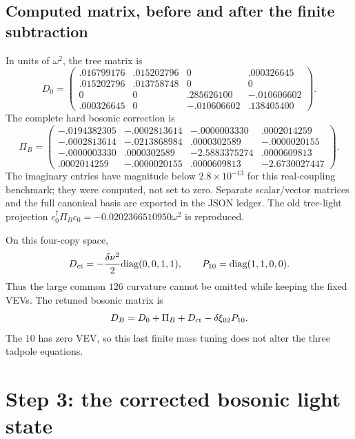 \documentclass[11pt]{article}
\begin{document}
\subsection{Computed matrix, before and after the finite subtraction}
In units of $\omega^2$, the tree matrix is
\begin{equation}
D_0=\begin{pmatrix}
.016799176&.015202796&0&.000326645\\
.015202796&.013758748&0&0\\
0&0&.285626100&-.010606602\\
.000326645&0&-.010606602&.138405400
\end{pmatrix}.
\end{equation}
The complete hard bosonic correction is
\begin{equation}
\Pi_B=\begin{pmatrix}
-.0194382305&-.0002813614&-.0000003330&.0002014259\\
-.0002813614&-.0213868984&.0000302589&-.0000020155\\
-.0000003330&.0000302589&-2.5883375274&.0000609813\\
.0002014259&-.0000020155&.0000609813&-2.6730027447
\end{pmatrix}.
\end{equation}
The imaginary entries have magnitude below $2.8\times10^{-13}$ for this
real-coupling benchmark; they were computed, not set to zero. Separate
scalar/vector matrices and the full canonical basis are exported in the
JSON ledger. The old tree-light projection
$c_0^\dagger\Pi_Bc_0=-0.0202366510950\omega^2$ is reproduced.

On this four-copy space,
\begin{equation}
D_{\rm ct}=-\frac{\delta\nu^2}{2}\mathrm{diag}(0,0,1,1),\qquad
P_{10}=\mathrm{diag}(1,1,0,0).
\end{equation}
Thus the large common $126$ curvature cannot be omitted while keeping the
fixed VEVs. The retuned bosonic matrix is
\begin{equation}
D_B=D_0+\Pi_B+D_{\rm ct}-\delta\xi_{02}P_{10}.
\label{eq:assembled}
\end{equation}
The $10$ has zero VEV, so this last finite mass tuning does not alter the
three tadpole equations.

\section{Step 3: the corrected bosonic light state}
\end{document}
